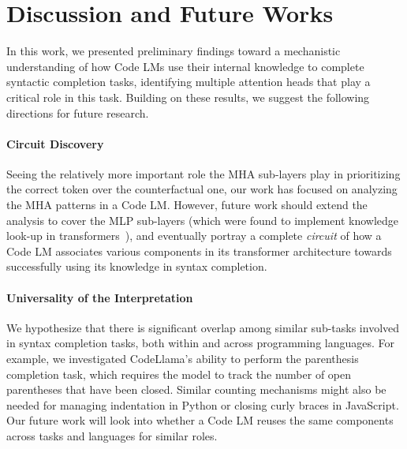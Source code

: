 \section{Discussion and Future Works} \label{sec: discussion}
{In this work, we presented preliminary findings toward a mechanistic understanding of how Code LMs use their internal knowledge to complete syntactic completion tasks, identifying multiple attention heads that play a critical role in this task. Building on these results, we suggest the following directions for future research.}

{\paragraph{Circuit Discovery}
Seeing the relatively more important role the MHA sub-layers play in prioritizing the correct token over the counterfactual one, our work has focused on analyzing the MHA patterns in a Code LM. However, future work should extend the analysis to cover the MLP sub-layers (which were found to implement knowledge look-up in transformers~\cite{geva2021transformer}), and eventually portray a complete \emph{circuit} of how a Code LM associates various components in its transformer architecture towards successfully using its knowledge in syntax completion.}


{\paragraph{Universality of the Interpretation}
We hypothesize that there is significant overlap among similar sub-tasks involved in syntax completion tasks, both within and across programming languages. For example, we investigated CodeLlama's ability to perform the parenthesis completion task, which requires the model to track the number of open parentheses that have been closed. Similar counting mechanisms might also be needed for managing indentation in Python or closing curly braces in JavaScript. Our future work will look into whether a Code LM reuses the same components across tasks and languages for similar roles.
}

